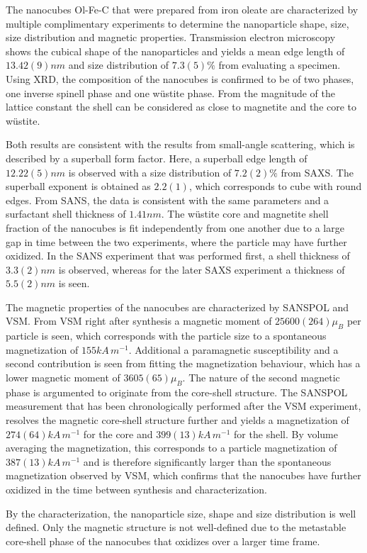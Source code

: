 \documentclass[\main/dresen_thesis.tex]{subfiles}
\begin{document}
  \label{sec:colloidalCrystals:nanoparticle:summary}
  The nanocubes Ol-Fe-C that were prepared from iron oleate are characterized by multiple complimentary experiments to determine the nanoparticle shape, size, size distribution and magnetic properties.
  Transmission electron microscopy shows the cubical shape of the nanoparticles and yields a mean edge length of $13.42(9) \unit{nm}$ and size distribution of $7.3(5) \%$ from evaluating a specimen.
  Using XRD, the composition of the nanocubes is confirmed to be of two phases, one inverse spinell phase and one w\"ustite phase.
  From the magnitude of the lattice constant the shell can be considered as close to magnetite and the core to w\"ustite.

  Both results are consistent with the results from small-angle scattering, which is described by a superball form factor.
  Here, a superball edge length of $12.22(5) \unit{nm}$ is observed with a size distribution of $7.2(2) \%$ from SAXS.
  The superball exponent is obtained as $2.2(1)$, which corresponds to cube with round edges.
  From SANS, the data is consistent with the same parameters and a surfactant shell thickness of $1.41 \unit{nm}$.
  The w\"ustite core and magnetite shell fraction of the nanocubes is fit independently from one another due to a large gap in time between the two experiments, where the particle may have further oxidized.
  In the SANS experiment that was performed first, a shell thickness of $3.3(2) \unit{nm}$ is observed, whereas for the later SAXS experiment a thickness of $5.5(2) \unit{nm}$ is seen.
  
  The magnetic properties of the nanocubes are characterized by SANSPOL and VSM.
  From VSM right after synthesis a magnetic moment of $25600(264) \mu_B$ per particle is seen, which corresponds with the particle size to a spontaneous magnetization of $155 \unit{kA \, m^{-1}}$.
  Additional a paramagnetic susceptibility and a second contribution is seen from fitting the magnetization behaviour, which has a lower magnetic moment of $3605(65) \mu_B$.
  The nature of the second magnetic phase is argumented to originate from the core-shell structure.
  The SANSPOL measurement that has been chronologically performed after the VSM experiment, resolves the magnetic core-shell structure further and yields a magnetization of $274(64) \unit{kA \, m^{-1}}$ for the core and $399(13) \unit{kA \, m^{-1}}$ for the shell.
  By volume averaging the magnetization, this corresponds to a particle magnetization of $387(13) \unit{kA \, m^{-1}}$ and is therefore significantly larger than the spontaneous magnetization observed by VSM, which confirms that the nanocubes have further oxidized in the time between synthesis and characterization.

  By the characterization, the nanoparticle size, shape and size distribution is well defined.
  Only the magnetic structure is not well-defined due to the metastable core-shell phase of the nanocubes that oxidizes over a larger time frame.
\end{document}
